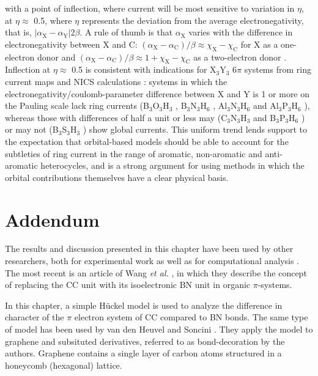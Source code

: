 with a point of inflection, where current will be most sensitive to variation in $\eta$, at $\eta \approx$ 0.5, where $\eta$ represents the deviation
from the average electronegativity, that is, $| \alpha_\mathrm{X}- \alpha_\mathrm{Y} | 2\beta$. A rule of thumb is that $\alpha_\mathrm{X}$
varies with the difference in electronegativity between X and C: $(\alpha_\mathrm{X} - \alpha_\mathrm{C})/\beta \approx \chi_\mathrm{X}-\chi_\mathrm{C}$
for X as a one-electron donor and  $(\alpha_\mathrm{X} - \alpha_\mathrm{C})/\beta \approx 1 + \chi_\mathrm{X}-\chi_\mathrm{C}$ as a two-electron
donor \cite{r22a}. Inflection at $\eta\approx$ 0.5 is consistent with indications for X$_3$Y$_3$ 6$\pi$ systems from ring current maps \cite{r02} and
NICS calculations \cite{r27c}: systems in which the electronegativity/coulomb-parameter difference between X and Y is 1 or
more on the Pauling scale lack ring currents (B$_3$O$_3$H$_3$ \cite{r02,r27c}, B$_3$N$_3$H$_6$ \cite{r02,r27c}, Al$_3$N$_3$H$_6$ \cite{r27c} and
Al$_3$P$_3$H$_6$ \cite{r27c}), whereas those with differences of half a unit or less may (C$_3$N$_3$H$_3$ \cite{r02,r27c} and B$_3$P$_3$H$_6$ \cite{r27c})
or may not (B$_3$S$_3$H$_3$ \cite{r27c}) show global currents. This uniform trend lends support to the expectation that orbital-based models should be able to
account for the subtleties of ring current in the range of aromatic, non-aromatic and anti-aromatic heterocycles, and is a strong argument for
using methods in which the orbital contributions themselves have a clear physical basis.

\section*{Addendum}
The results and discussion presented in this chapter have been used by other researchers, both for experimental work \cite{ae01,ae02,ae03} as well as for computational analysis \cite{ac01,ac02,ac03,ac04,ac05}. The most recent is an article of Wang \textit{et al.} \cite{ae01}, in which they describe the concept of replacing the CC unit with its isoelectronic BN unit in organic $\pi$-systems. 

In this chapter, a simple H\"uckel model is used to analyze the difference in character of the $\pi$ electron system of CC compared to BN bonds. The same type of model has been used by van den Heuvel and Soncini \cite{ac02}. They apply the model to graphene and subsituted derivatives, referred to as bond-decoration by the authors. Graphene contains a single layer of carbon atoms structured in a honeycomb (hexagonal) lattice.

